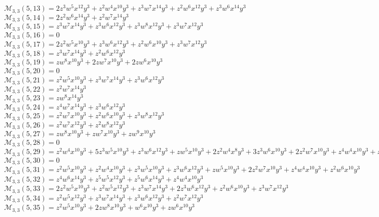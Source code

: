 \documentclass[12pt]{memoireuqam1.3}
\begin{document}
$\mathcal{M}_{3,3}(5,13)=2z^3w^5x^{12}y^3+z^2w^4x^{10}y^3+z^3w^7x^{14}y^3+z^2w^6x^{12}y^3+z^3w^6x^{14}y^3$\\
$\mathcal{M}_{3,3}(5,14)=2z^2w^6x^{14}y^3+z^2w^7x^{14}y^3$\\
$\mathcal{M}_{3,3}(5,15)=z^3w^7x^{14}y^3+z^3w^6x^{12}y^3+z^3w^8x^{12}y^3+z^3w^7x^{12}y^3$\\
$\mathcal{M}_{3,3}(5,16)=0$\\
$\mathcal{M}_{3,3}(5,17)=2z^2w^5x^{10}y^3+z^3w^6x^{12}y^3+z^2w^6x^{10}y^3+z^3w^7x^{12}y^3$\\
$\mathcal{M}_{3,3}(5,18)=z^3w^7x^{14}y^3+z^2w^6x^{12}y^3$\\
$\mathcal{M}_{3,3}(5,19)=zw^8x^{10}y^3+2zw^7x^{10}y^3+2zw^6x^{10}y^3$\\
$\mathcal{M}_{3,3}(5,20)=0$\\
$\mathcal{M}_{3,3}(5,21)=z^2w^5x^{10}y^3+z^3w^7x^{14}y^3+z^3w^6x^{12}y^3$\\
$\mathcal{M}_{3,3}(5,22)=z^2w^7x^{14}y^3$\\
$\mathcal{M}_{3,3}(5,23)=zw^8x^{14}y^3$\\
$\mathcal{M}_{3,3}(5,24)=z^4w^7x^{14}y^3+z^3w^6x^{12}y^3$\\
$\mathcal{M}_{3,3}(5,25)=z^2w^7x^{10}y^3+z^2w^6x^{10}y^3+z^3w^8x^{12}y^3$\\
$\mathcal{M}_{3,3}(5,26)=z^2w^7x^{12}y^3+z^2w^8x^{12}y^3$\\
$\mathcal{M}_{3,3}(5,27)=zw^8x^{10}y^3+zw^7x^{10}y^3+zw^9x^{10}y^3$\\
$\mathcal{M}_{3,3}(5,28)=0$\\
$\mathcal{M}_{3,3}(5,29)=z^2w^4x^{10}y^3+5z^3w^5x^{10}y^3+z^3w^6x^{12}y^3+zw^5x^{10}y^3+2z^2w^4x^8y^3+3z^3w^6x^{10}y^3+2z^2w^7x^{10}y^3+z^4w^4x^{10}y^3+z^2w^5x^8y^3$\\
$\mathcal{M}_{3,3}(5,30)=0$\\
$\mathcal{M}_{3,3}(5,31)=z^2w^5x^{10}y^3+z^2w^4x^{10}y^3+z^3w^5x^{10}y^3+z^3w^6x^{12}y^3+zw^5x^{10}y^3+2z^2w^7x^{10}y^3+z^4w^4x^{10}y^3+z^2w^6x^{10}y^3$\\
$\mathcal{M}_{3,3}(5,32)=z^4w^6x^{14}y^3+z^5w^5x^{12}y^3+z^5w^6x^{14}y^3+z^4w^4x^{10}y^3$\\
$\mathcal{M}_{3,3}(5,33)=2z^2w^5x^{10}y^3+z^2w^5x^{12}y^3+z^3w^7x^{14}y^3+2z^3w^6x^{12}y^3+z^2w^6x^{10}y^3+z^3w^7x^{12}y^3$\\
$\mathcal{M}_{3,3}(5,34)=z^2w^5x^{12}y^3+z^3w^7x^{14}y^3+z^3w^6x^{12}y^3+z^2w^7x^{12}y^3$\\
$\mathcal{M}_{3,3}(5,35)=z^2w^5x^{10}y^3+2zw^8x^{10}y^3+w^6x^{10}y^3+zw^6x^{10}y^3$\\
\end{document}
